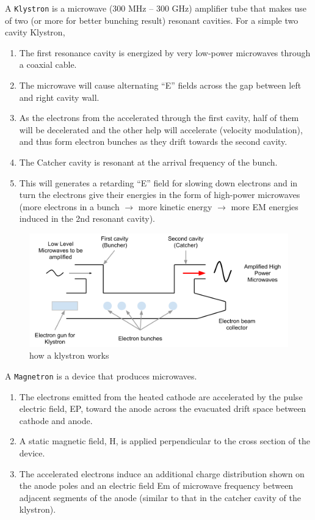 \documentclass[]{book}
\providecommand{\tightlist}{%
  \setlength{\itemsep}{0pt}\setlength{\parskip}{0pt}}
\theoremstyle{definition}
\theoremstyle{definition}
\theoremstyle{definition}
\theoremstyle{remark}
\begin{document}
A \texttt{Klystron} is a microwave (300 MHz -- 300 GHz) amplifier tube
that makes use of two (or more for better bunching result) resonant
cavities. For a simple two cavity Klystron,

\begin{enumerate}
\def\labelenumi{\arabic{enumi}.}
\tightlist
\item
  The first resonance cavity is energized by very low-power microwaves
  through a coaxial cable.
\item
  The microwave will cause alternating ``E'' fields across the gap
  between left and right cavity wall.
\item
  As the electrons from the accelerated through the first cavity, half
  of them will be decelerated and the other help will accelerate
  (velocity modulation), and thus form electron bunches as they drift
  towards the second cavity.
\item
  The Catcher cavity is resonant at the arrival frequency of the bunch.
\item
  This will generates a retarding ``E'' field for slowing down electrons
  and in turn the electrons give their energies in the form of
  high-power microwaves (more electrons in a bunch \(\rightarrow\) more
  kinetic energy \(\rightarrow\) more EM energies induced in the 2nd
  resonant cavity).
\end{enumerate}

\begin{figure}

{\centering \includegraphics{figures/klystron} 

}

\caption{how a klystron works}\label{fig:unnamed-chunk-6}
\end{figure}

A \texttt{Magnetron} is a device that produces microwaves.

\begin{enumerate}
\def\labelenumi{\arabic{enumi}.}
\tightlist
\item
  The electrons emitted from the heated cathode are accelerated by the
  pulse electric field, EP, toward the anode across the evacuated drift
  space between cathode and anode.
\item
  A static magnetic field, H, is applied perpendicular to the cross
  section of the device.
\item
  The accelerated electrons induce an additional charge distribution
  shown on the anode poles and an electric field Em of microwave
  frequency between adjacent segments of the anode (similar to that in
  the catcher cavity of the klystron).
\end{enumerate}
\end{document}
